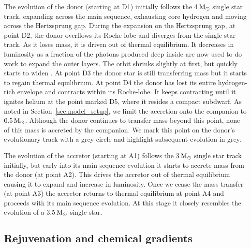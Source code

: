 \documentclass[desactivate]{aa}
\newcommand{\referee}[1]{{#1}}
\begin{document}
The evolution of the donor (starting at D1) initially follows the 4$\,{\rm M_\odot}$ single star track, expanding across the main sequence, exhausting core hydrogen and moving across the Hertzsprung gap. During the expansion on the Hertzsprung gap, at point D2, the donor overflows its Roche-lobe and diverges from the single star track. As it loses mass, it is driven out of thermal equilibrium. It decreases in luminosity as a fraction of the photons produced deep inside are now used to do work to expand the outer layers.  The orbit shrinks slightly at first, but quickly starts to widen \citep{Renzo+2019:2019A&A...624A..66R}. At point D3 the donor star is still transferring mass but it starts to regain thermal equilibrium. At point D4 the donor has lost its entire hydrogen-rich envelope and contracts within its Roche-lobe. It keeps contracting until it ignites helium at the point marked D5, where it resides a compact subdwarf. \referee{As noted in Section~\ref{sec:model_setup}, we limit the accretion onto the companion to $0.5 \, {\rm M_\odot}$. Although the donor continues to transfer mass beyond this point, none of this mass is accreted by the companion. We mark this point on the donor's evolutionary track with a grey circle and highlight subsequent evolution in grey.}


The evolution of the accretor (starting at A1) follows the 3$\,{\rm M_\odot}$ single star track initially, but early into its main sequence evolution it starts to accrete mass from the donor (at point A2).  This drives the accretor out of thermal equilibrium causing it to expand and increase in luminosity. Once we cease the mass transfer (at point A3) the accretor returns to thermal equilibrium at point A4 and proceeds with its main sequence evolution. At this stage it closely resembles the evolution of a 3.5$\,{\rm M_\odot}$ single star.

\subsection{Rejuvenation and chemical gradients}\label{sec:xh_profiles}
\end{document}

